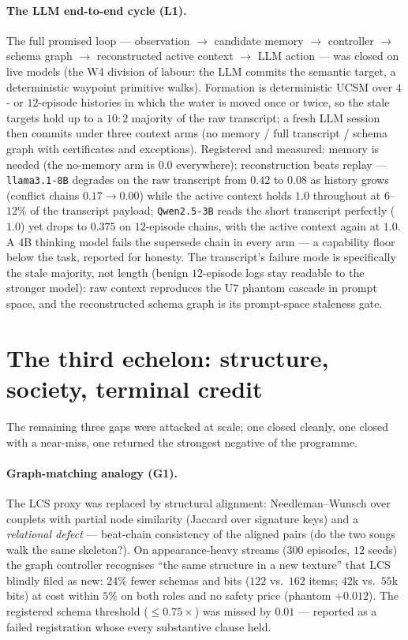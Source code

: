 \documentclass{article}
\begin{document}
\paragraph{The LLM end-to-end cycle (L1).} The full promised loop ---
observation $\to$ candidate memory $\to$ controller $\to$ schema
graph $\to$ reconstructed active context $\to$ LLM action --- was
closed on live models (the W4 division of labour: the LLM commits the
semantic target, a deterministic waypoint primitive walks). Formation
is deterministic UCSM over $4$- or $12$-episode histories in which
the water is moved once or twice, so the stale targets hold up to a
$10{:}2$ majority of the raw transcript; a fresh LLM session then
commits under three context arms (no memory / full transcript /
schema graph with certificates and exceptions). Registered and
measured: memory is needed (the no-memory arm is $0.0$ everywhere);
reconstruction beats replay --- \texttt{llama3.1-8B} degrades on the
raw transcript from $0.42$ to $0.08$ as history grows (conflict
chains $0.17 \to 0.00$) while the active context holds $1.0$
throughout at $6$--$12\%$ of the transcript payload;
\texttt{Qwen2.5-3B} reads the short transcript perfectly ($1.0$) yet
drops to $0.375$ on $12$-episode chains, with the active context
again at $1.0$. A $4$B thinking model fails the supersede chain in
every arm --- a capability floor below the task, reported for
honesty. The transcript's failure mode is specifically the stale
majority, not length (benign $12$-episode logs stay readable to the
stronger model): raw context reproduces the U7 phantom cascade in
prompt space, and the reconstructed schema graph is its prompt-space
staleness gate.


\section{The third echelon: structure, society, terminal credit}
\label{sec:echelon3}

The remaining three gaps were attacked at scale; one closed cleanly,
one closed with a near-miss, one returned the strongest negative of
the programme.

\paragraph{Graph-matching analogy (G1).} The LCS proxy was replaced
by structural alignment: Needleman--Wunsch over couplets with partial
node similarity (Jaccard over signature keys) and a \emph{relational
defect} --- beat-chain consistency of the aligned pairs (do the two
songs walk the same skeleton?). On appearance-heavy streams
($300$ episodes, $12$ seeds) the graph controller recognises ``the
same structure in a new texture'' that LCS blindly filed as new:
$24\%$ fewer schemas and bits ($122$ vs.\ $162$ items; $42$k vs.\
$55$k bits) at cost within $5\%$ on both roles and no safety price
(phantom $+0.012$). The registered schema threshold ($\le 0.75\times$)
was missed by $0.01$ --- reported as a failed registration whose
every substantive clause held.
\end{document}
